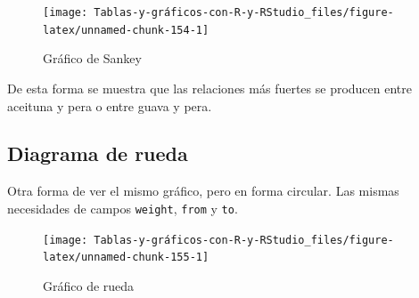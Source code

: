\documentclass[
]{book}
\newenvironment{Shaded}{\begin{snugshade}}{\end{snugshade}}
\newcommand{\AttributeTok}[1]{\textcolor[rgb]{0.77,0.63,0.00}{#1}}
\newcommand{\ConstantTok}[1]{\textcolor[rgb]{0.00,0.00,0.00}{#1}}
\newcommand{\FunctionTok}[1]{\textcolor[rgb]{0.00,0.00,0.00}{#1}}
\newcommand{\NormalTok}[1]{#1}
\newcommand{\SpecialCharTok}[1]{\textcolor[rgb]{0.00,0.00,0.00}{#1}}
\newcommand{\StringTok}[1]{\textcolor[rgb]{0.31,0.60,0.02}{#1}}
\begin{document}
\begin{figure}[H]

{\centering \texttt{[image: Tablas-y-gráficos-con-R-y-RStudio\_files/figure-latex/unnamed-chunk-154-1]} 

}

\caption{Gráfico de Sankey}\label{fig:unnamed-chunk-154}
\end{figure}

De esta forma se muestra que las relaciones más fuertes se producen entre aceituna y pera o entre guava y pera.

\hypertarget{diagrama-de-rueda}{%
\subsection{Diagrama de rueda}\label{diagrama-de-rueda}}

Otra forma de ver el mismo gráfico, pero en forma circular. Las mismas necesidades de campos \texttt{weight}, \texttt{from} y \texttt{to}.

\begin{Shaded}
\end{Shaded}

\begin{figure}[H]

{\centering \texttt{[image: Tablas-y-gráficos-con-R-y-RStudio\_files/figure-latex/unnamed-chunk-155-1]} 

}

\caption{Gráfico de rueda}\label{fig:unnamed-chunk-155}
\end{figure}
\end{document}

